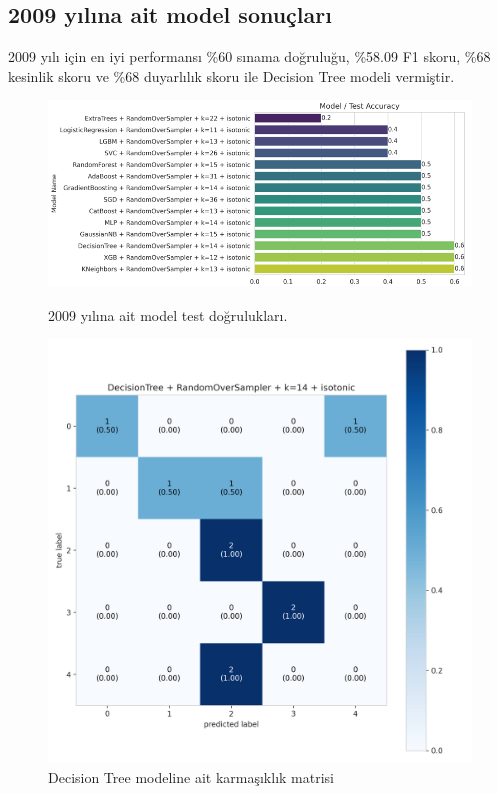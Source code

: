 \newpage

\subsection{2009 yılına ait model sonuçları}
2009 yılı için en iyi performansı \%60 sınama doğruluğu,  \%58.09 F1 skoru, \%68 kesinlik skoru ve \%68 duyarlılık skoru ile Decision Tree modeli vermiştir.

\begin{figure}[ht]
\centering
\begin{minipage}[b]{0.6\textwidth}
    \centering
    \includegraphics[width=\textwidth]{2009.png}
    \caption{2009 yılına ait model test doğrulukları.}
    \label{fig:resim1}
\end{minipage}
\hfill
\begin{minipage}[b]{0.6\textwidth}
    \centering
    \includegraphics[width=\textwidth]{2009_cm.png}
    \caption{Decision Tree modeline ait karmaşıklık matrisi}
    \label{fig:resim2}
\end{minipage}
\end{figure}

